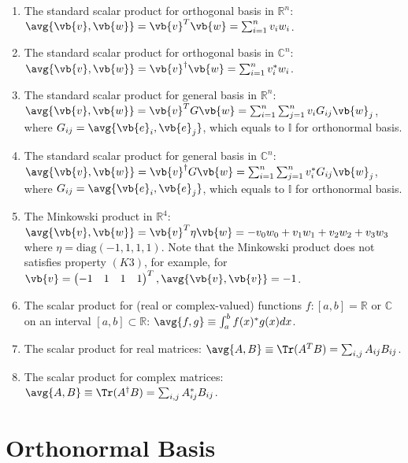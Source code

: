 \documentclass[a4paper,12pt]{report}
\begin{document}
\begin{enumerate}
    \item The standard scalar product for orthogonal basis in \(\mathbb{R}^{n} \): \(\avg{\vb{v} ,\vb{w} }  = \vb{v} ^T \vb{w} = \sum_{i=1}^{n} v_{i} w_{i} \).  
    \item The standard scalar product for orthogonal basis in \(\mathbb{C}^{n} \): \(\avg{\vb{v} ,\vb{w} } = \vb{v} ^{\dagger} \vb{w} = \sum_{i=1}^{n} v_{i}^*w_{i} \).
    \item The standard scalar product for general basis in \(\mathbb{R}^{n} \): \(\avg{\vb{v} ,\vb{w} } = \vb{v} ^T G\vb{w} = \sum_{i=1}^{n} \sum_{j=1}^{n}  v_{i}G_{ij}\vb{w} _{j}   \), where \(G_{ij} = \avg{\vb{e} _{i}, \vb{e} _{j}  }  \), which equals to \(\mathbb{I}\) for orthonormal basis.
    \item The standard scalar product for general basis in \(\mathbb{C}^{n} \): \(\avg{\vb{v} ,\vb{w} } = \vb{v} ^{\dagger}  G\vb{w} = \sum_{i=1}^{n} \sum_{j=1}^{n}  v_{i}^*G_{ij}\vb{w} _{j}   \), where \(G_{ij} = \avg{\vb{e} _{i}, \vb{e} _{j}  }  \), which equals to \(\mathbb{I}\) for orthonormal basis.
    \item The Minkowski product in \(\mathbb{R}^{4} \): \(\avg{\vb{v} ,\vb{w} } = \vb{v} ^{T} \eta \vb{w} = -v_0 w_0 + v_1 w_1 +v_2 w_2 +v_3 w_3    \) where \(\eta = \text{diag}  (-1,1,1,1)\). Note that the Minkowski product does not satisfies property \((K3)\), for example, for \(\vb{v} = \begin{pmatrix}
        -1 & 1 & 1 &  1 \\
    \end{pmatrix}^{T} , \avg{\vb{v} ,\vb{v} }  = -1\).
    \item The scalar product for (real or complex-valued) functions \(f: [a,b] = \mathbb{R}\text { or } \mathbb{C}\) on an interval \([a,b] \subset \mathbb{R}\): \(\avg{f,g} \equiv \int_{a}^{b} f(x)^{*} g(x)dx\). 
    \item The scalar product for real matrices: \(\avg{A, B} \equiv \Tr (A^{T}B ) = \sum_{i,j}^{} A_{ij} B_{ij}\).
    \item The scalar product for complex matrices: \(\avg{A, B} \equiv \Tr (A^{\dagger} B ) = \sum_{i,j}^{} A_{ij}^* B_{ij}\).
\end{enumerate}

\section{Orthonormal Basis}
\end{document}
